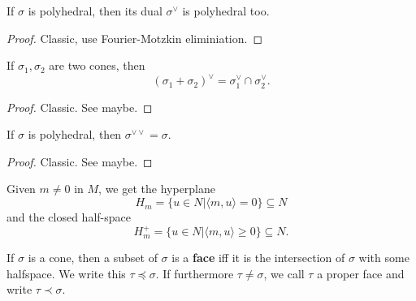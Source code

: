 \begin{proposition}
  \label{1-2-4-dual-polyhedral-cone}
  \leanok

  If $\sigma$ is polyhedral, then its dual $\sigma^\vee$ is polyhedral too.
\end{proposition}
\begin{proof}
  \leanok

  Classic, use Fourier-Motzkin eliminiation.
\end{proof}


\begin{proposition}
  \label{1-2-dual-cone-add}

  If $\sigma_1, \sigma_2$ are two cones, then
  $$(\sigma_1 + \sigma_2)^\vee = \sigma_1^\vee \cap \sigma_2^\vee.$$
\end{proposition}
\begin{proof}

  Classic. See \cite{Oda_1988} maybe.
\end{proof}


\begin{proposition}
  \label{1-2-4-double-dual-polyhedral-cone}

  If $\sigma$ is polyhedral, then $\sigma^{\vee\vee} = \sigma$.
\end{proposition}
\begin{proof}

  Classic. See \cite{Oda_1988} maybe.
\end{proof}


Given $m \ne 0$ in $M$, we get the hyperplane
$$H_m = \{u \in N | \langle m, u\rangle = 0\} \subseteq N$$
and the closed half-space
$$H_m^+ = \{u \in N | \langle m, u\rangle \ge 0\} \subseteq N.$$


\begin{definition}
  \label{1-2-5-face}
  \leanok

  If $\sigma$ is a cone, then a subset of $\sigma$ is a {\bf face} iff it is the intersection of $\sigma$ with some halfspace. We write this $\tau \preceq \sigma$. If furthermore $\tau \ne \sigma$, we call $\tau$ a proper face and write $\tau \prec \sigma$.
\end{definition}



